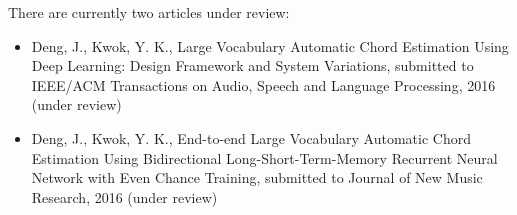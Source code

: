 There are currently two articles under review:
\begin{itemize}
\item Deng, J., Kwok, Y. K., Large Vocabulary Automatic Chord Estimation Using Deep Learning: Design Framework and System Variations, submitted to IEEE/ACM Transactions on Audio, Speech and Language Processing, 2016 (under review)
\item Deng, J., Kwok, Y. K., End-to-end Large Vocabulary Automatic Chord Estimation Using Bidirectional Long-Short-Term-Memory Recurrent Neural Network with Even Chance Training, submitted to Journal of New Music Research, 2016 (under review)
\end{itemize}




